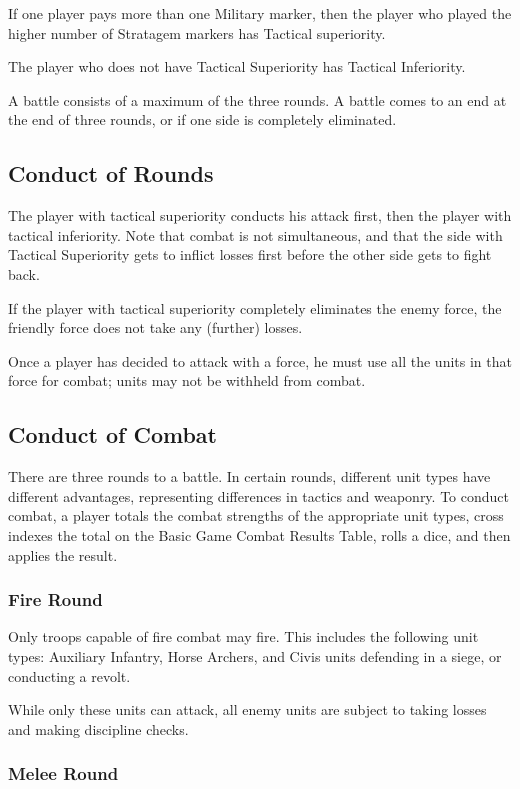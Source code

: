 If one player pays more than one Military marker, then the player who played the higher number of Stratagem markers has Tactical superiority.

The player who does not have Tactical Superiority has Tactical Inferiority.

A battle consists of a maximum of the three rounds. A battle comes to an end at the end of three rounds, or if one side is completely eliminated.

\subsection{Conduct of Rounds}

The player with tactical superiority conducts his attack first, then the player with tactical inferiority. Note that combat is not simultaneous, and that the side with Tactical Superiority gets to inflict losses first before the other side gets to fight back.

If the player with tactical superiority completely eliminates the enemy force, the friendly force does not take any (further) losses.

Once a player has decided to attack with a force, he must use all the units in that force for combat; units may not be withheld from combat.

\subsection{Conduct of Combat}

There are three rounds to a battle. In certain rounds, different unit types have different advantages, representing differences in tactics and weaponry. To conduct combat, a player totals the combat strengths of the appropriate unit types, cross indexes the total on the Basic Game Combat Results Table, rolls a dice, and then applies the result.

\subsubsection{Fire Round}

Only troops capable of fire combat may fire. This includes the following unit types: Auxiliary Infantry, Horse Archers, and Civis units defending in a siege, or conducting a revolt.

While only these units can attack, all enemy units are subject to taking losses and making discipline checks.

\subsubsection{Melee Round}

